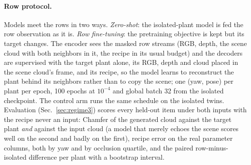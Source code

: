 \paragraph{Row protocol.}
Models meet the rows in two ways. \emph{Zero-shot}: the isolated-plant model
is fed the row observation as it is. \emph{Row fine-tuning}: the pretraining
objective is kept but its target changes. The encoder sees the masked row
streams (RGB, depth, the scene cloud with both neighbors in it, the recipe in
its usual budget) and the decoders are supervised with the target plant alone,
its RGB, depth and cloud placed in the scene cloud's frame, and its recipe, so
the model learns to reconstruct the plant behind its neighbors rather than to
copy the scene; one (yaw, pose) per plant per epoch, 100 epochs at
$10^{-4}$ and global batch 32 from the isolated checkpoint. The control arm
runs the same schedule on the isolated twins. Evaluation (Sec.~\ref{sec:regime3})
scores every held-out item under both inputs with the recipe never an input:
Chamfer of the generated cloud against the target plant \emph{and} against the
input cloud (a model that merely echoes the scene scores well on the second and
badly on the first), recipe error on the real parameter columns, both by yaw
and by occlusion quartile, and the paired row-minus-isolated difference per
plant with a bootstrap interval.

